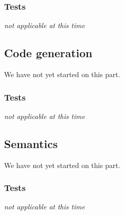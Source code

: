 \documentclass[11pt]{article}
\begin{document}
\subsubsection{Tests}
{\it not applicable at this time}%

\subsection{Code generation}
We have not yet started on this part.

\subsubsection{Tests}%
{\it not applicable at this time}%

\subsection{Semantics}
We have not yet started on this part.

\subsubsection{Tests}
{\it not applicable at this time}%
\end{document}
